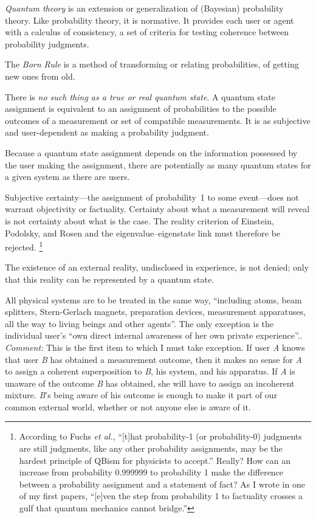 \documentclass[smallextended]{svjour3}
\begin{document}
 \item \emph{Quantum theory} is an extension or generalization of (Bayesian) probability theory. Like probability theory, it is normative. It provides each user or agent with a calculus of consistency, a set of criteria for testing coherence between probability judgments.
\item The \emph{Born Rule} is a method of transforming or relating probabilities, of getting new ones from old.
\item  There is \emph{no such thing as a true or real quantum state}. A quantum state assignment is equivalent to an assignment of probabilities to the possible outcomes of a measurement or set of compatible measurements. It is as subjective and user-dependent as making a probability judgment.
\item Because a quantum state assignment depends on the information possessed by the user making the assignment, there are potentially as many quantum states for a given system as there are users.
\item Subjective certainty---the assignment of probability~1 to some event---does not warrant objectivity or factuality. Certainty about what a measurement will reveal is not certainty about what is the case. The reality criterion of Einstein, Podolsky, and Rosen\cite{EPR} and the eigenvalue--eigenstate link\cite{Gilton2016} must therefore be rejected.%
\footnote{According to Fuchs \emph{et al.},\cite{FMS2014} ``[t]hat probability-1 (or probability-0) judgments are still judgments, like any other probability assignments, may be the hardest principle of QBism for physicists to accept.'' Really? How can an increase from probability 0.999999 to probability 1 make the difference between a probability assignment and a statement of fact? As I wrote in one of my first papers,\cite{WQMITTU} ``[e]ven the step from probability 1 to factuality crosses a gulf that quantum mechanics cannot bridge.''}
\item The existence of an external reality, undisclosed in experience, is not denied; only that this reality can be represented by a quantum state.
\item All physical systems are to be treated in the same way, ``including atoms, beam splitters, Stern-Gerlach magnets, preparation devices, measurement apparatuses, all the way to living beings and other agents''.\cite{FS2015} The only exception is the individual user's ``own direct internal awareness of her own private experience''.\cite{FMS2014}.\hfill\break
\emph{Comment:} This is the first item to which I must take exception. If user \emph{A} knows that user \emph{B} has obtained a measurement outcome, then it makes no sense for \emph{A} to assign a coherent superposition to \emph{B}, his system, and his apparatus. If \emph{A} is unaware of the outcome \emph{B} has obtained, she will have to assign an incoherent mixture. \emph{B}'s being aware of his outcome is enough to make it part of our common external world, whether or not anyone else is aware of it. 
\end{document}
